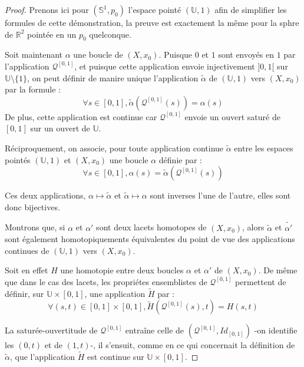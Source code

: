 \begin{proof}
Prenons ici pour $(\mathbb{S}^1,p_0)$ l'espace point\'e $(\mathbb{U},1)$ afin de simplifier les formules de cette d\'emonstration, %
la preuve est exactement la m\^eme pour la sphre de $\mathbb{R}^2$ point\'ee en un $p_0$ quelconque.

\par
Soit maintenant $\alpha$ une boucle de $(X,x_0)$. %
Puisque $0$ et $1$ sont envoy\'es en $1$ par l'application $\mathcal{Q}^{[0,1]}$, %
et puisque cette application envoie injectivement $]0,1[$ sur $\mathbb{U}\setminus\{1\}$, %
on peut d\'efinir de manire unique l'application $\tilde{\alpha}$ de $(\mathbb{U},1)$ vers $(X,x_0)$ par la formule :
\[\forall s \in [0,1],\tilde{\alpha}\left(\mathcal{Q}^{[0,1]}(s)\right)=\alpha (s)\]
De plus, cette application est continue car $\mathcal{Q}^{[0,1]}$ envoie un ouvert satur\'e de $[0,1]$ sur un ouvert de $\mathbb{U}$.

\par
R\'eciproquement, on associe, pour toute application continue $\tilde{\alpha}$ entre les espaces point\'es $(\mathbb{U},1)$ et $(X,x_0)$ %
une boucle $\alpha$ d\'efinie par :
\[\forall s\in [0,1],\alpha(s)=\tilde{\alpha}\left(\mathcal{Q}^{[0,1]}(s)\right)\]

Ces deux applications, $\alpha\mapsto\tilde{\alpha}$ et $\tilde{\alpha}\mapsto\alpha$ sont inverses l'une de l'autre, elles sont donc bijectives.

\par
Montrons que, si $\alpha$ et $\alpha '$ sont deux lacets homotopes de $(X,x_0)$,%
alors $\tilde{\alpha}$ et $\tilde{\alpha '}$ sont \'egalement homotopiquements \'equivalentes du point de vue des applications continues de $(\mathbb{U},1)$ vers $(X,x_0)$.

\par
Soit en effet $H$ une homotopie entre deux boucles $\alpha$ et $\alpha '$ de $(X,x_0)$. %
De m\^eme que dans le cas des lacets, les propri\'etes ensemblistes de $\mathcal{Q}^{[0,1]}$ %
permettent de d\'efinir, sur $\mathbb{U}\times [0,1]$, une application $\tilde{H}$ par :
\[\forall (s,t)\in[0,1]\times [0,1],\tilde{H}\left(\mathcal{Q}^{[0,1]}(s),t\right)=H(s,t)\]

La satur\'ee-ouvertitude de $\mathcal{Q}^{[0,1]}$ entra\^ine celle de $\left(\mathcal{Q}^{[0,1]},Id_{[0,1]}\right)$ -on identifie les $(0,t)$ et de $(1,t)$-, %
il s'ensuit, comme en  ce qui concernait la d\'efinition de $\tilde{\alpha}$, que l'application $\tilde{H}$ est continue sur $\mathbb{U}\times[0,1]$.


\end{proof}
